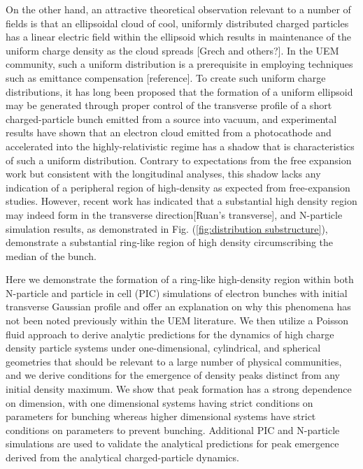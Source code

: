 \documentclass[aps,prl,twocolumn,showpacs,superscriptaddress,groupedaddress]{revtex4-1}  %
\begin{document}
{On the other hand, an 
attractive theoretical observation relevant to a number
of fields is 
that an ellipsoidal cloud of cool, uniformly distributed
charged particles has a linear electric field within the ellipsoid which results in maintenance of the 
uniform charge density as the cloud spreads [Grech and others?].    
In the UEM community, such a uniform distribution is a prerequisite 
in employing techniques such as emittance compensation [reference].
To create such uniform charge distributions, it has long been proposed that the formation of a uniform ellipsoid may be generated through
proper control of the transverse profile 
of a short charged-particle bunch emitted from a source into vacuum\cite{Luiten:2004_uniform_ellipsoidal}, 
and experimental results have shown that  
an electron cloud emitted from a photocathode and accelerated into the highly-relativistic regime has a shadow that is characteristics of 
such a uniform distribution\cite{Musucemi:2008_generate_uniform_ellipsoid}.  Contrary to
expectations from the free expansion work but consistent with the longitudinal analyses, this shadow
lacks any indication of a peripheral region of high-density as expected from free-expansion studies.
However, recent work has indicated that a substantial high density region may indeed form in
the transverse direction[Ruan's transverse], and N-particle simulation results, as
demonstrated in Fig. (\ref{fig:distribution substructure}), demonstrate a substantial
ring-like region of high density circumscribing the median of the bunch.
  
Here we demonstrate the formation of a ring-like high-density region
within both N-particle and particle in cell (PIC)
simulations of electron bunches with initial transverse Gaussian profile
and offer an explanation on why this phenomena has not been noted previously
within the UEM literature.  
We then utilize a Poisson fluid approach to derive analytic predictions 
for the dynamics of high charge density particle systems under one-dimensional, 
cylindrical, and spherical geometries
that should be relevant to a large number of physical communities, and we derive conditions 
for the emergence of density peaks distinct from any initial density maximum.
We show that peak formation has a strong dependence on 
dimension, with one dimensional systems having strict conditions on parameters for bunching whereas higher
dimensional systems have strict conditions on parameters to prevent bunching.   Additional PIC and
N-particle simulations are 
used to validate the analytical predictions for peak emergence
derived from the analytical charged-particle dynamics.  

}
\end{document}

